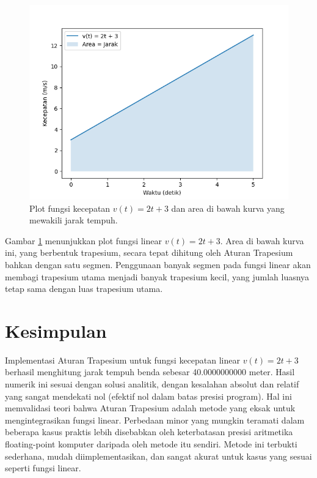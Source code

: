 \documentclass[conference]{IEEEtran}
\begin{document}
\begin{figure}[htbp]
\centerline{\includegraphics[width=1.0\linewidth]{images/velocity_plot.png}} %
\caption{Plot fungsi kecepatan \( v(t) = 2t + 3 \) dan area di bawah kurva yang mewakili jarak tempuh.}
\label{fig:velocity}
\end{figure}

Gambar \ref{fig:velocity} menunjukkan plot fungsi linear \( v(t) = 2t + 3 \). Area di bawah kurva ini, yang berbentuk trapesium, secara tepat dihitung oleh Aturan Trapesium bahkan dengan satu segmen. Penggunaan banyak segmen pada fungsi linear akan membagi trapesium utama menjadi banyak trapesium kecil, yang jumlah luasnya tetap sama dengan luas trapesium utama.

\section{Kesimpulan}
Implementasi Aturan Trapesium untuk fungsi kecepatan linear \(v(t) = 2t+3\) berhasil menghitung jarak tempuh benda sebesar 40.0000000000 meter. Hasil numerik ini sesuai dengan solusi analitik, dengan kesalahan absolut dan relatif yang sangat mendekati nol (efektif nol dalam batas presisi program). Hal ini memvalidasi teori bahwa Aturan Trapesium adalah metode yang eksak untuk mengintegrasikan fungsi linear. Perbedaan minor yang mungkin teramati dalam beberapa kasus praktis lebih disebabkan oleh keterbatasan presisi aritmetika floating-point komputer daripada oleh metode itu sendiri. Metode ini terbukti sederhana, mudah diimplementasikan, dan sangat akurat untuk kasus yang sesuai seperti fungsi linear.
\end{document}
